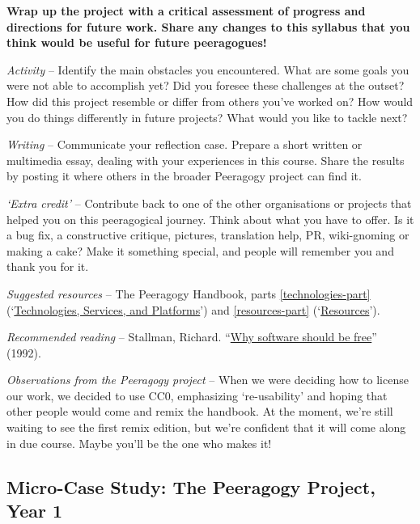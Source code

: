 \textbf{Wrap up the project with a critical assessment of progress and
directions for future work. Share any changes to this syllabus that you
think would be useful for future peeragogues!}

\medskip

\emph{Activity} -- Identify the main obstacles you encountered. What are
some goals you were not able to accomplish yet? Did you foresee these
challenges at the outset? How did this project resemble or differ from
others you've worked on? How would you do things differently in future
projects? What would you like to tackle next?

\medskip

\emph{Writing} -- Communicate your reflection case. Prepare a short
written or multimedia essay, dealing with your experiences in this
course. Share the results by posting it where others in the broader
Peeragogy project can find it.

\medskip

\emph{`Extra credit'} -- Contribute back to one of the other
organisations or projects that helped you on this peeragogical journey.
Think about what you have to offer. Is it a bug fix, a constructive
critique, pictures, translation help, PR, wiki-gnoming or making a cake?
Make it something special, and people will remember you and thank you
for it.

\medskip

\emph{Suggested resources} -- The Peeragogy Handbook, parts \ref{technologies-part}
(`\href{http://peeragogy.org/resources/technologies/}{Technologies,
Services, and Platforms}') and \ref{resources-part}
(`\href{http://peeragogy.org/resources/}{Resources}').

\medskip

\emph{Recommended reading} -- Stallman, Richard.
``\href{http://www.gnu.org/philosophy/shouldbefree.html}{Why software
should be free}'' (1992).

\medskip

\emph{Observations from the Peeragogy project} -- When we were deciding
how to license our work, we decided to use CC0, emphasizing
`re-usability' and hoping that other people would come and remix the
handbook. At the moment, we're still waiting to see the first remix
edition, but we're confident that it will come along in due course.
Maybe you'll be the one who makes it!

\clearpage
\subsection{Micro-Case Study: The Peeragogy Project, Year 1}

